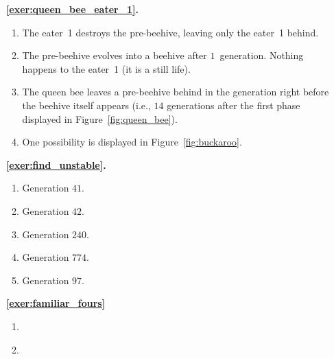 \begin{multicols}{2}
\begin{itemize}[leftmargin=0em]
		
		\item[\bf\color{ocre}\sffamily\ref{exer:queen_bee_eater_1}.] \begin{enumerate}[leftmargin=1.5em,label=\bf\color{ocre}(\alph*)]
			\item The eater~1 destroys the pre-beehive, leaving only the eater~1 behind.
			
			\item The pre-beehive evolves into a beehive after $1$~generation. Nothing happens to the eater~1 (it is a still life).
			
			\item The queen bee leaves a pre-beehive behind in the generation right before the beehive itself appears (i.e., $14$ generations after the first phase displayed in Figure~\ref{fig:queen_bee}).
			
			\item One possibility is displayed in Figure~\ref{fig:buckaroo}. \\
		\end{enumerate} 
	
	
		\item[\bf\color{ocre}\sffamily\ref{exer:find_unstable}.] \begin{enumerate}[leftmargin=1.5em,label=\bf\color{ocre}(\alph*)]
			\item Generation $41$.
			
			\item Generation $42$.
			
			\item Generation $240$.
			
			\item Generation $774$.
			
			\item Generation $97$. \\
		\end{enumerate}
	
	
		\item[\bf\color{ocre}\sffamily\ref{exer:familiar_fours}]
			\begin{enumerate}[leftmargin=1.5em,label=\bf\color{ocre}(\alph*)]
				\item {}
				
				\item {} \\
			\end{enumerate}
		

\end{itemize}
\end{multicols}
